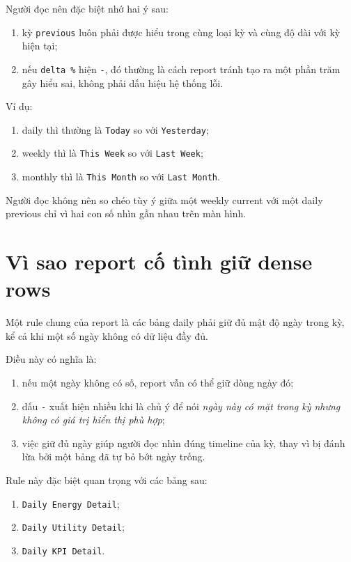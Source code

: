 Người đọc nên đặc biệt nhớ hai ý sau:

\begin{enumerate}[label=-]
\item kỳ \texttt{previous} luôn phải được hiểu trong cùng loại kỳ và cùng độ dài với kỳ hiện tại;
\item nếu \texttt{delta \%} hiện \texttt{-}, đó thường là cách report tránh tạo ra một phần trăm gây hiểu sai, không phải dấu hiệu hệ thống lỗi.
\end{enumerate}

Ví dụ:

\begin{enumerate}[label=-]
\item daily thì thường là \texttt{Today} so với \texttt{Yesterday};
\item weekly thì là \texttt{This Week} so với \texttt{Last Week};
\item monthly thì là \texttt{This Month} so với \texttt{Last Month}.
\end{enumerate}

Người đọc không nên so chéo tùy ý giữa một weekly current với một daily previous chỉ vì hai con số nhìn gần nhau trên màn hình.

\section{Vì sao report cố tình giữ dense rows}

Một rule chung của report là các bảng daily phải giữ đủ mật độ ngày trong kỳ, kể cả khi một số ngày không có dữ liệu đầy đủ.

Điều này có nghĩa là:

\begin{enumerate}[label=-]
\item nếu một ngày không có số, report vẫn có thể giữ dòng ngày đó;
\item dấu \texttt{-} xuất hiện nhiều khi là chủ ý để nói \textit{ngày này có mặt trong kỳ nhưng không có giá trị hiển thị phù hợp};
\item việc giữ đủ ngày giúp người đọc nhìn đúng timeline của kỳ, thay vì bị đánh lừa bởi một bảng đã tự bỏ bớt ngày trống.
\end{enumerate}

Rule này đặc biệt quan trọng với các bảng sau:

\begin{enumerate}[label=-]
\item \texttt{Daily Energy Detail};
\item \texttt{Daily Utility Detail};
\item \texttt{Daily KPI Detail}.
\end{enumerate}


